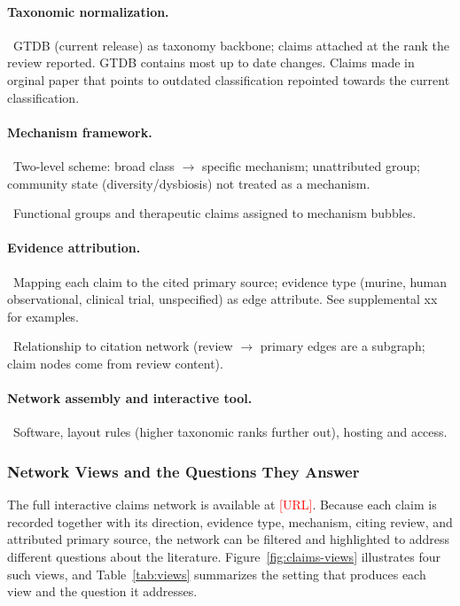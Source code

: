 \documentclass[11pt,a4paper]{article}
\newcommand{\todoitem}[1]{\par\noindent\textcolor{blue!70!black}{\textbullet~#1}}
\newcommand{\ph}[1]{\textcolor{red}{[#1]}}  %
\begin{document}
\paragraph{Taxonomic normalization.}
\todoitem{GTDB (current release) as taxonomy backbone; claims attached at the rank the review reported. GTDB contains most up to date changes. Claims made in orginal paper that points to outdated classification repointed towards the current classification. }

\paragraph{Mechanism framework.}
\todoitem{Two-level scheme: broad class $\to$ specific mechanism; unattributed group; community state (diversity/dysbiosis) not treated as a mechanism.}
\todoitem{Functional groups and therapeutic claims assigned to mechanism bubbles.}

\paragraph{Evidence attribution.}
\todoitem{Mapping each claim to the cited primary source; evidence type (murine, human observational, clinical trial, unspecified) as edge attribute. See supplemental xx for examples.}
\todoitem{Relationship to citation network (review $\to$ primary edges are a subgraph; claim nodes come from review content).}

\paragraph{Network assembly and interactive tool.}
\todoitem{Software, layout rules (higher taxonomic ranks further out), hosting and access.}

\subsubsection{Network Views and the Questions They Answer}
\label{sec:claims-views}

The full interactive claims network is available at \ph{URL}. Because each claim is recorded together with its direction, evidence type, mechanism, citing review, and attributed primary source, the network can be filtered and highlighted to address different questions about the literature. Figure~\ref{fig:claims-views} illustrates four such views, and Table~\ref{tab:views} summarizes the setting that produces each view and the question it addresses.
\end{document}
